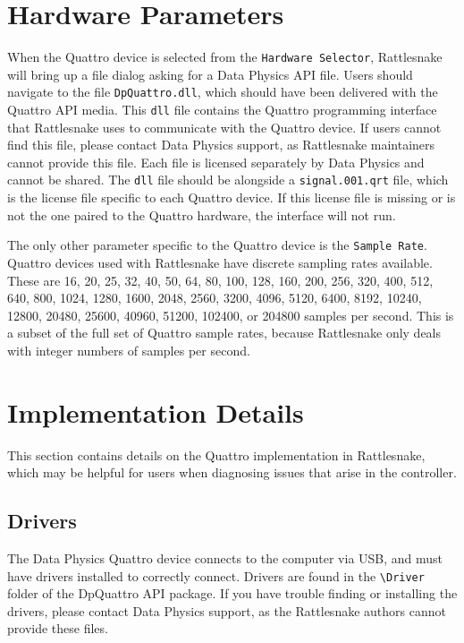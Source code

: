 \documentclass[pdf,12pt,report]{SANDreport}
\newcommand{\inlineCode}{\lstinline[basicstyle=\bfseries\ttfamily]}
\begin{document}
    \section{Hardware Parameters}
    When the Quattro device is selected from the \inlineCode{Hardware Selector}, Rattlesnake will bring up a file dialog asking for a Data Physics \ac{API} file.  Users should navigate to the file \inlineCode{DpQuattro.dll}, which should have been delivered with the Quattro \ac{API} media.  This \inlineCode{dll} file contains the Quattro programming interface that Rattlesnake uses to communicate with the Quattro device.  If users cannot find this file, please contact Data Physics support, as Rattlesnake maintainers cannot provide this file.  Each file is licensed separately by Data Physics and cannot be shared.  The \inlineCode{dll} file should be alongside a \inlineCode{signal.001.qrt} file, which is the license file specific to each Quattro device.  If this license file is missing or is not the one paired to the Quattro hardware, the interface will not run.
    
    The only other parameter specific to the Quattro device is the \inlineCode{Sample Rate}.  Quattro devices used with Rattlesnake have discrete sampling rates available.  These are 16, 20, 25, 32, 40, 50, 64, 80, 100, 128, 160, 200, 256, 320, 400, 512, 640, 800, 1024, 1280, 1600, 2048, 2560, 3200, 4096, 5120, 6400, 8192, 10240, 12800, 20480, 25600, 40960, 51200, 102400, or 204800 samples per second.  This is a subset of the full set of Quattro sample rates, because Rattlesnake only deals with integer numbers of samples per second.
    
    \section{Implementation Details}
    This section contains details on the Quattro implementation in Rattlesnake, which may be helpful for users when diagnosing issues that arise in the controller.
    
    \subsection{Drivers}
    The Data Physics Quattro device connects to the computer via USB, and must have drivers installed to correctly connect.  Drivers are found in the \inlineCode{\Driver} folder of the DpQuattro \ac{API} package.  If you have trouble finding or installing the drivers, please contact Data Physics support, as the Rattlesnake authors cannot provide these files.
    
\end{document}
